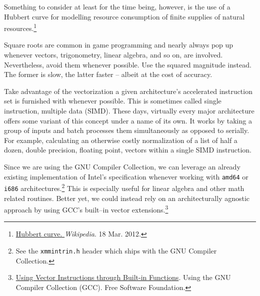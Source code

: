 Something to consider at least for the time being, however, is the use of a Hubbert curve for modelling resource consumption of finite supplies of natural resources.\footnote{\href{https://en.wikipedia.org/wiki/Hubbert_curve}{Hubbert curve. }{\it Wikipedia}. 18 Mar. 2012.}

Square roots are common in game programming and nearly always pop up whenever vectors, trigonometry, linear algebra, and so on, are involved. Nevertheless, avoid them whenever possible. Use the squared magnitude instead. The former is slow, the latter faster -- albeit at the cost of accuracy.

Take advantage of the vectorization a given architecture's accelerated instruction set is furnished with whenever possible. This is sometimes called single instruction, multiple data (SIMD). These days, virtually every major architecture offers some variant of this concept under a name of its own. It works by taking a group of inputs and batch processes them simultaneously as opposed to serially. For example, calculating an otherwise costly normalization of a list of half a dozen, double precision, floating point, vectors within a single SIMD instruction.

Since we are using the GNU Compiler Collection, we can leverage an already existing implementation of Intel's specification whenever working with {\tt amd64} or {\tt i686} architectures.\footnote{See the {\tt xmmintrin.h} header which ships with the GNU Compiler Collection.} This is especially useful for linear algebra and other math related routines. Better yet, we could instead rely on an architecturally agnostic approach by using GCC's built--in vector extensions.\footnote
{\href{http://gcc.gnu.org/onlinedocs/gcc/Vector-Extensions.html}{Using Vector Instructions through Built-in Functions}. Using the GNU Compiler Collection (GCC). Free Software Foundation.}


